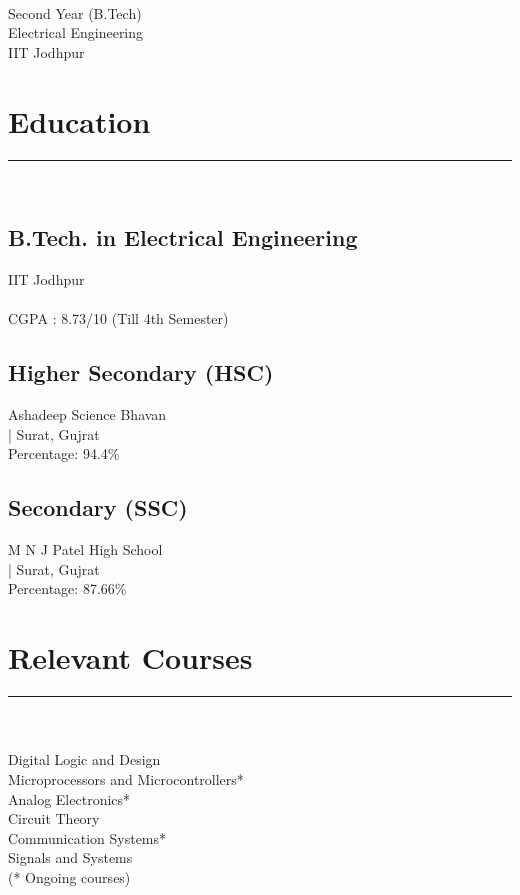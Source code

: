 \documentclass[]{resume}
\begin{document}
%
%

\begin{minipage}[t]{0.33\textwidth} 
\begin{large}
	\\
\end{large}
Second Year (B.Tech)\\
Electrical  Engineering\\ 
IIT Jodhpur \\ 
\section{Education} 
\vspace{-0.5em}
\noindent\rule{5cm}{0.4pt}\\
\subsection{B.Tech. in Electrical Engineering}
IIT Jodhpur \\
\\
CGPA : 8.73/10 (Till 4th Semester)\\
\vspace{8pt}
\subsection{Higher Secondary (HSC)}
Ashadeep Science Bhavan\\
| Surat, Gujrat \\
Percentage: 94.4\%\\
\vspace{8pt}
\subsection{Secondary (SSC)}
M N J Patel High School\\
| Surat, Gujrat \\
Percentage: 87.66\%\\
\sectionsep
\section{Relevant Courses}
\vspace{-0.5em}
\noindent\rule{5cm}{0.4pt}\\
\\
Digital Logic and Design\\
Microprocessors and Microcontrollers*\\
Analog Electronics*\\
Circuit Theory\\
Communication Systems*\\
Signals and Systems\\
(* Ongoing courses)\\


\end{minipage}
\end{document}
